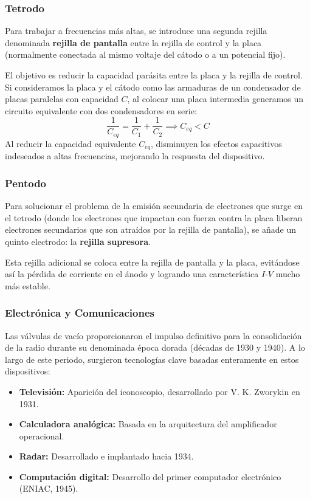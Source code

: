 \subsubsection{Tetrodo}
Para trabajar a frecuencias más altas, se introduce una segunda rejilla denominada \textbf{rejilla de pantalla} entre la rejilla de control y la placa (normalmente conectada al mismo voltaje del cátodo o a un potencial fijo).

El objetivo es reducir la capacidad parásita entre la placa y la rejilla de control. Si consideramos la placa y el cátodo como las armaduras de un condensador de placas paralelas con capacidad $C$, al colocar una placa intermedia generamos un circuito equivalente con dos condensadores en serie:
\[
\frac{1}{C_{eq}} = \frac{1}{C_1} + \frac{1}{C_2} \implies C_{eq} < C
\]
Al reducir la capacidad equivalente $C_{eq}$, disminuyen los efectos capacitivos indeseados a altas frecuencias, mejorando la respuesta del dispositivo.

\subsubsection{Pentodo}
Para solucionar el problema de la emisión secundaria de electrones que surge en el tetrodo (donde los electrones que impactan con fuerza contra la placa liberan electrones secundarios que son atraídos por la rejilla de pantalla), se añade un quinto electrodo: la \textbf{rejilla supresora}.

Esta rejilla adicional se coloca entre la rejilla de pantalla y la placa, evitándose así la pérdida de corriente en el ánodo y logrando una característica $I$-$V$ mucho más estable.

\subsubsection{Electrónica y Comunicaciones}

Las válvulas de vacío proporcionaron el impulso definitivo para la consolidación de la radio durante su denominada época dorada (décadas de 1930 y 1940). A lo largo de este periodo, surgieron tecnologías clave basadas enteramente en estos dispositivos:

\begin{itemize}
    \item \textbf{Televisión:} Aparición del iconoscopio, desarrollado por V. K. Zworykin en 1931.
    \item \textbf{Calculadora analógica:} Basada en la arquitectura del amplificador operacional.
    \item \textbf{Radar:} Desarrollado e implantado hacia 1934.
    \item \textbf{Computación digital:} Desarrollo del primer computador electrónico (ENIAC, 1945).
\end{itemize}

